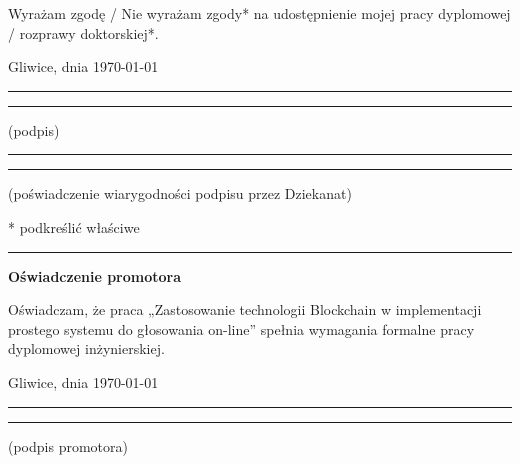 \documentclass[a4paper,12pt]{book}
\newcommand{\tytul}{Zastosowanie technologii Blockchain w implementacji prostego systemu do głosowania on-line}
\begin{document}
\vfill

Wyrażam  zgodę / Nie wyrażam zgody*  na  udostępnienie  mojej  pracy  dyplomowej / rozprawy doktorskiej*.

\vfill

Gliwice, dnia \today

\vfill

\rule{0.5\textwidth}{0cm}\dotfill 

\rule{0.5\textwidth}{0cm}
\begin{minipage}{0.45\textwidth}
{\begin{center}(podpis)\end{center}}
\end{minipage} 

\vfill

\rule{0.5\textwidth}{0cm}\dotfill 

\rule{0.5\textwidth}{0cm}
\begin{minipage}{0.45\textwidth}
{\begin{center}\rule{0mm}{5mm}(poświadczenie wiarygodności podpisu przez Dziekanat)\end{center}}
\end{minipage}


\vfill

* podkreślić właściwe

 


\cleardoublepage

\rule{1cm}{0cm}

\vfill  

\begin{center}
\Large\bfseries Oświadczenie promotora
\end{center}

\vfill

Oświadczam, że praca „\tytul” spełnia wymagania formalne pracy dyplomowej inżynierskiej.

\vfill



\vfill

Gliwice, dnia \today

\rule{0.5\textwidth}{0cm}\dotfill 

\rule{0.5\textwidth}{0cm}
\begin{minipage}{0.45\textwidth}
{\begin{center}(podpis promotora)\end{center}}
\end{minipage} 
\end{document}
